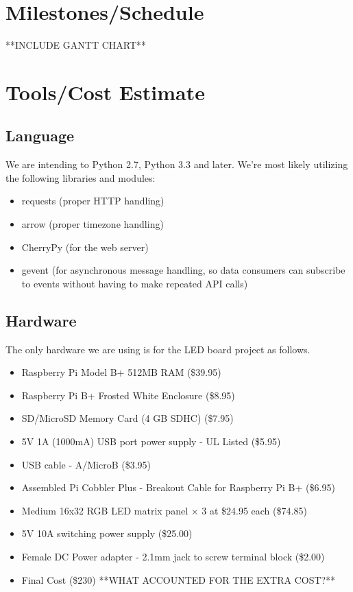 \documentclass[12pt]{article}
\begin{document}
\section{Milestones/Schedule}
**INCLUDE GANTT CHART**

\section{Tools/Cost Estimate}
\subsection{Language}
We are intending to Python 2.7, Python 3.3 and later. We're most likely utilizing the following
libraries and modules:
\begin{itemize}
\item requests (proper HTTP handling)
\item arrow (proper timezone handling)
\item CherryPy (for the web server)
\item gevent (for asynchronous message handling, so data consumers can subscribe to events
without having to make repeated API calls)
\end{itemize}

\subsection{Hardware}
The only hardware we are using is for the LED board project as follows.
\begin{itemize}
\item Raspberry Pi Model B+ 512MB RAM (\$39.95)
\item Raspberry Pi B+ Frosted White Enclosure (\$8.95)
\item SD/MicroSD Memory Card (4 GB SDHC) (\$7.95)
\item 5V 1A (1000mA) USB port power supply - UL Listed (\$5.95)
\item USB cable - A/MicroB (\$3.95)
\item Assembled Pi Cobbler Plus - Breakout Cable for Raspberry Pi B+ (\$6.95)
\item Medium 16x32 RGB LED matrix panel × 3 at \$24.95 each (\$74.85)
\item 5V 10A switching power supply (\$25.00)
\item Female DC Power adapter - 2.1mm jack to screw terminal block (\$2.00)
\item Final Cost (\$230) **WHAT ACCOUNTED FOR THE EXTRA COST?**
\end{itemize}
\end{document}
